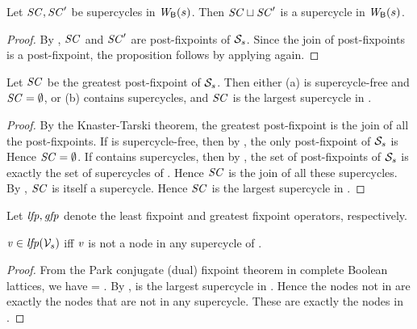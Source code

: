 \begin{proposition} \label{prop:supercycle:union}
Let $\mathit{SC}, \mathit{SC}'$ be supercycles in $\mathit{W}_{\mathsf{B}}({s})$. Then $\mathit{SC} \sqcup \mathit{SC}'$ is
a supercycle in $\mathit{W}_{\mathsf{B}}({s})$.
\end{proposition}
%
\begin{proof}
By , $\mathit{SC}$ and $\mathit{SC}'$ are post-fixpoints of $\mathcal{S}_s$. Since the join of post-fixpoints is a post-fixpoint, 
the proposition follows by applying  again.
\end{proof}




\begin{proposition} \label{prop:GFPisLargestSC}
Let $\mathit{SC}$ be the greatest post-fixpoint of $\mathcal{S}_s$. Then either
(a)  is supercycle-free and $\mathit{SC} = \emptyset$, or 
(b)  contains supercycles, and $\mathit{SC}$ is the largest supercycle in .
\end{proposition}
%
\begin{proof}
By the Knaster-Tarski theorem, the greatest post-fixpoint is the join of all the post-fixpoints. 
If  is supercycle-free, then by , the only post-fixpoint of $\mathcal{S}_s$ is \ewfg
Hence $\mathit{SC} = \emptyset$.
If  contains supercycles, then by ,  the set of post-fixpoints of $\mathcal{S}_s$ is exactly the set of 
supercycles of . Hence $\mathit{SC}$ is the join of all these supercycles. By , $\mathit{SC}$ is itself a supercycle.
Hence $\mathit{SC}$ is the largest supercycle in .
\end{proof}

Let $\mathit{lfp}, \mathit{gfp}$ denote the least fixpoint and greatest fixpoint operators, respectively.

\begin{proposition}  \label{prop:LFPisScViolations}
$\mathit{v} \in  \mathit{lfp}(\mathcal{V}_s)$ iff $\mathit{v}$ is not a node in any supercycle of .    
\end{proposition}
%
\begin{proof}
From the Park conjugate (dual) fixpoint theorem in complete Boolean lattices, we have 
 = .
By ,  is the largest supercycle in . Hence the nodes not in 
 are exactly the nodes that are not in any supercycle. These are exactly the nodes in .
\end{proof}

